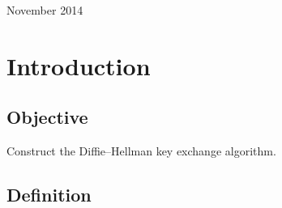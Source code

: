 \documentclass{article}
\begin{document}
\begin{titlepage}
\begin{center}
  \vspace{15 mm}


  {\large November 2014}\\[3cm] %




  \vfill %
  \end{center}
  \end{titlepage}



  \section{Introduction}

  \subsection{Objective}

  Construct the Diffie–Hellman key exchange algorithm.

  \subsection{Definition}
\end{document}
